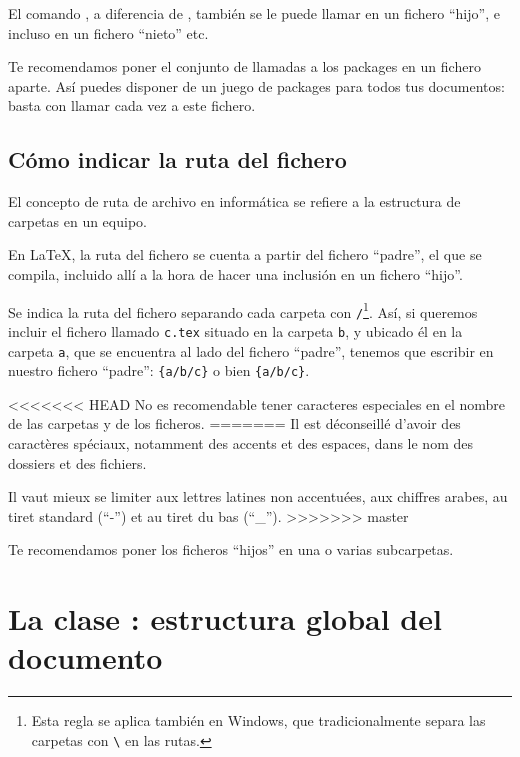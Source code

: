 El comando , a diferencia de  , también se le puede llamar en un fichero \enquote{hijo}, e incluso en un fichero \enquote{nieto} etc.

Te recomendamos poner el conjunto de llamadas a los packages en un fichero aparte. Así puedes disponer de un juego de packages para todos tus documentos: basta con llamar cada vez a este fichero.


\subsection{Cómo indicar la ruta del fichero}\label{chemin}

El concepto de ruta de archivo en informática se refiere a la estructura de carpetas en un equipo.

En \LaTeX{}, la ruta del fichero se cuenta a partir del fichero \enquote{padre}, el que se compila, incluido allí a la hora de hacer una inclusión en un fichero \enquote{hijo}.

Se indica la ruta del fichero separando cada carpeta con \verb|/|\footnote{Esta regla se aplica también en Windows, que tradicionalmente separa las carpetas con \texttt{\textbackslash} en las rutas.}. Así, si queremos incluir el fichero llamado \verb|c.tex| situado en la carpeta \verb|b|, y ubicado él en la carpeta \verb|a|, que se encuentra al lado del fichero \enquote{padre}, tenemos que escribir en nuestro fichero \enquote{padre}: \verb|{a/b/c}|
o bien
\verb|{a/b/c}|.

\begin{attention}

<<<<<<< HEAD
No es recomendable tener caracteres especiales en el nombre de las carpetas y de los ficheros.
=======
Il est déconseillé d'avoir des caractères spéciaux, notamment des accents et des espaces, dans le nom des dossiers et des fichiers. 

Il vaut mieux se limiter aux lettres latines non accentuées, aux chiffres arabes, au tiret standard (\enquote{-}) et au tiret du bas (\enquote{\_}).
>>>>>>> master
\end{attention}

Te recomendamos poner los ficheros \enquote{hijos} en una o varias subcarpetas.

\section{La clase : estructura global del documento}\label{sectionbook}

